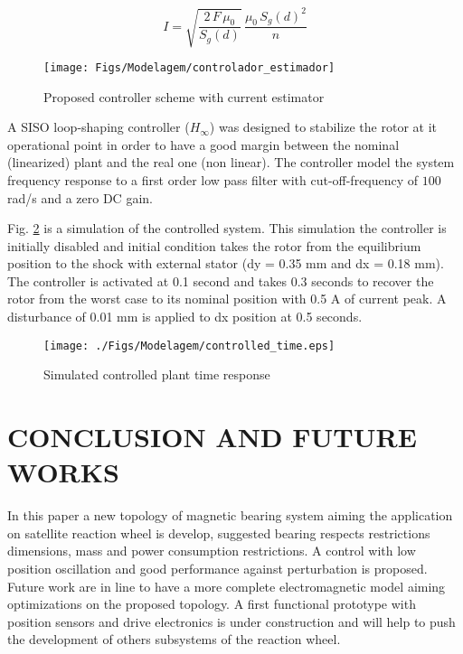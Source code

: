 \documentclass[10pt,fleqn,a4paper,twoside]{article}
\begin{document}
	\begin{equation}
	I = \sqrt{\frac{2 \, F \, \mu_0}{S_g(d)}} \, \frac{\mu_0 \, S_g(d)^2}{n}
	\label{eq:estimator:i}
	\end{equation}
	
	\begin{figure}[ht]
	\centering
	\texttt{[image: Figs/Modelagem/controlador\_estimador]}
	\caption{Proposed controller scheme with current estimator}
	\label{fig:diagrama_controlador_estimador}
	\end{figure}
		
	A SISO loop-shaping controller ($H_{\infty}$) \citep{skogestad2007multivariable} was designed to stabilize the rotor at it operational point  in order to have a good margin between the nominal (linearized) plant and the real one (non linear). The controller model the system frequency response to a first order low pass filter with cut-off-frequency of $100$ rad/s and a zero DC gain.
	
	Fig. \ref{fig:controlled} is a simulation of the controlled system. This simulation the controller is initially disabled and initial condition takes the rotor from the equilibrium position to the shock with external stator (dy = 0.35 mm and dx = 0.18 mm). The controller is activated at 0.1 second and takes 0.3 seconds to recover the rotor from the worst case to its nominal position with 0.5 A of current peak. A disturbance of 0.01 mm is applied to dx position at 0.5 seconds. 
	
	\begin{figure}[ht]
	\centering
	\texttt{[image: ./Figs/Modelagem/controlled\_time.eps]}
	\caption{Simulated controlled plant time response}
	\label{fig:controlled}
	\end{figure}	
	
	\section{CONCLUSION AND FUTURE WORKS}
	
	In this paper a new topology of magnetic bearing system aiming the application on satellite reaction wheel is develop, suggested bearing respects restrictions dimensions, mass and power consumption restrictions. A control with low position oscillation and good performance against perturbation is proposed.	Future work are in line to have a more complete electromagnetic model aiming optimizations on the proposed topology. A first functional prototype with position sensors and drive electronics is under construction and will help to push the development of others subsystems of the reaction wheel.
		
\end{document}
